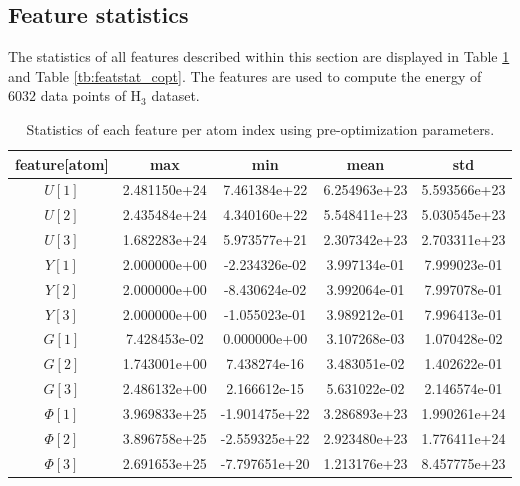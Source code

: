\documentclass[12pt]{article}
\begin{document}
\subsection{Feature statistics}
The statistics of all features described within this section are displayed in Table \ref{tb:featstat_crandom} and Table \ref{tb:featstat_copt}. The features are used to compute the energy of $6032$ data points of H$_3$ dataset.

\begin{table}[!htbp]
\centering
\caption{Statistics of each feature per atom index using pre-optimization parameters.}
\label{tb:featstat_crandom}
\begin{tabular}{ccccc}
\toprule
feature[atom] &   max & min & mean &  std \\
\midrule
$U[1]$    &  2.481150e+24 &  7.461384e+22 &  6.254963e+23 &  5.593566e+23 \\
$U[2]$    &  2.435484e+24 &  4.340160e+22 &  5.548411e+23 &  5.030545e+23 \\
$U[3]$    &  1.682283e+24 &  5.973577e+21 &  2.307342e+23 &  2.703311e+23 \\
$Y[1]$    &  2.000000e+00 & -2.234326e-02 &  3.997134e-01 &  7.999023e-01 \\
$Y[2]$    &  2.000000e+00 & -8.430624e-02 &  3.992064e-01 &  7.997078e-01 \\
$Y[3]$    &  2.000000e+00 & -1.055023e-01 &  3.989212e-01 &  7.996413e-01 \\
$G[1]$    &  7.428453e-02 &  0.000000e+00 &  3.107268e-03 &  1.070428e-02 \\
$G[2]$    &  1.743001e+00 &  7.438274e-16 &  3.483051e-02 &  1.402622e-01 \\
$G[3]$    &  2.486132e+00 &  2.166612e-15 &  5.631022e-02 &  2.146574e-01 \\
$\Phi[1]$ &  3.969833e+25 & -1.901475e+22 &  3.286893e+23 &  1.990261e+24 \\
$\Phi[2]$ &  3.896758e+25 & -2.559325e+22 &  2.923480e+23 &  1.776411e+24 \\
$\Phi[3]$ &  2.691653e+25 & -7.797651e+20 &  1.213176e+23 &  8.457775e+23 \\
\bottomrule
\end{tabular}
\end{table}
\end{document}
